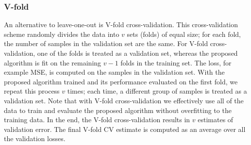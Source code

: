 \documentclass[12pt, krantz2,]{book}
\newenvironment{Shaded}{\begin{snugshade}}{\end{snugshade}}
\newcommand{\CommentTok}[1]{\textcolor[rgb]{0.56,0.35,0.01}{\textit{#1}}}
\newcommand{\DecValTok}[1]{\textcolor[rgb]{0.00,0.00,0.81}{#1}}
\newcommand{\KeywordTok}[1]{\textcolor[rgb]{0.13,0.29,0.53}{\textbf{#1}}}
\newcommand{\NormalTok}[1]{#1}
\newcommand{\StringTok}[1]{\textcolor[rgb]{0.31,0.60,0.02}{#1}}
\theoremstyle{definition}
\theoremstyle{definition}
\theoremstyle{definition}
\newcommand{\1}{\mathbbm{1}}
\begin{document}
\begin{Shaded}
\end{Shaded}

\hypertarget{v-fold}{%
\subsubsection{V-fold}\label{v-fold}}

An alternative to leave-one-out is V-fold cross-validation. This
cross-validation scheme randomly divides the data into \(v\) sets (folds) of equal
size; for each fold, the number of samples in the validation set are the same.
For V-fold cross-validation, one of the folds is treated as a validation set,
whereas the proposed algorithm is fit on the remaining \(v-1\) folds in the
training set. The loss, for example MSE, is computed on the samples in the
validation set. With the proposed algorithm trained and its performance
evaluated on the first fold, we repeat this process \(v\) times; each time, a
different group of samples is treated as a validation set. Note that with V-fold
cross-validation we effectively use all of the data to train and evaluate the
proposed algorithm without overfitting to the training data. In the end, the
V-fold cross-validation results in \(v\) estimates of validation error. The final
V-fold CV estimate is computed as an average over all the validation losses.
\end{document}

